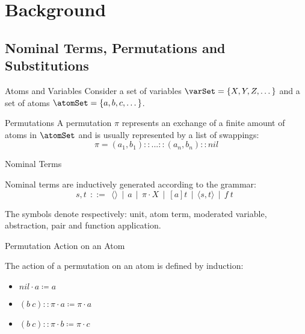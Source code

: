 \section{Background}
\subsection{Nominal Terms, Permutations and Substitutions}
\begin{frame}{Atoms and Variables} 
    Consider a set of variables $\varSet = \{X, Y, Z, \dots \}$ and 
    a set of atoms $\atomSet = \{a, b, c, \dots \}$.
\end{frame}

\begin{frame}{Permutations}
    A permutation $\pi$ represents an exchange of a finite amount of atoms in
    $\atomSet$
    and is usually represented by a list of swappings: 
\begin{equation*}
    \pi = (a_1, b_1):: ... ::(a_n, b_n)::nil 
\end{equation*}
\end{frame}

\begin{frame}{Nominal Terms}
    \begin{definition}
    Nominal terms are inductively generated according to the grammar: 
    \begin{equation*}
        s,t \ \ ::= \ \ \langle \rangle \ \ | \ \ a \ \ | \ \ \pi \cdot X \ \ | \ \ [a]t \ \ |
                    \ \ \langle s, t \rangle \ \       | \ \ f \ t \ \   
    \end{equation*}
    \end{definition}
    The symbols denote respectively: unit, atom term, moderated variable,
    abstraction, pair and function application.
\end{frame}

\begin{frame}{Permutation Action on an Atom}
    \begin{definition}
    The action of a permutation on an atom is defined by induction: 
    \begin{itemize} 
        \item $nil \cdot a \coloneqq a$ 
        \item $(b \ c):: \pi \cdot a \coloneqq \pi \cdot a$ 
        \item $(b \ c):: \pi \cdot b \coloneqq \pi \cdot c$ 
    \end{itemize}
    \end{definition}
\end{frame}

